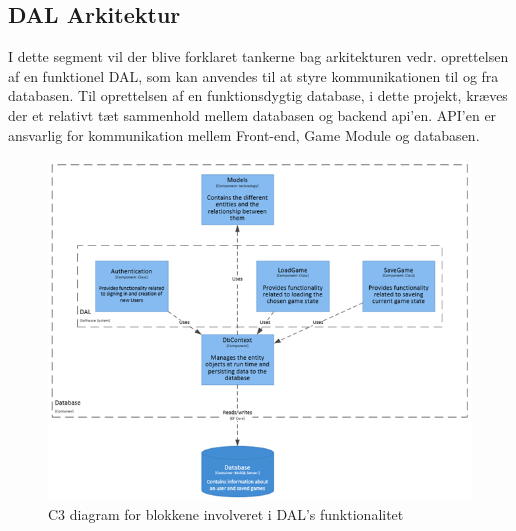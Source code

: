 \subsection{DAL Arkitektur}
I dette segment vil der blive forklaret tankerne bag arkitekturen vedr. oprettelsen af en funktionel DAL, som kan anvendes til at styre kommunikationen til og fra databasen.
Til oprettelsen af en funktionsdygtig database, i dette projekt, kræves der et relativt tæt sammenhold mellem databasen og backend api’en. API’en er ansvarlig for kommunikation mellem Front-end, Game Module og databasen.

\begin{figure}[H]
\centering
\includegraphics[width = \textwidth]{02-Body/Images/DALArkitektur}
\caption{C3 diagram for blokkene involveret i DAL's funktionalitet}
\label{fig:DALArkitektur}
\end{figure}


